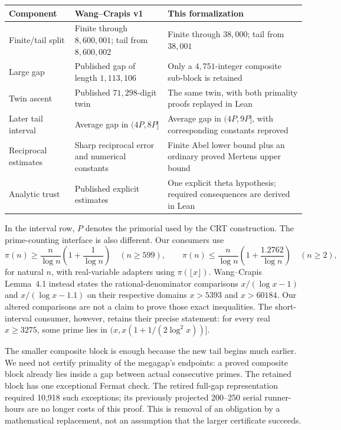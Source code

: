 \documentclass[11pt]{amsart}
\theoremstyle{definition}
\begin{document}
\begin{center}\small
\begin{tabular}{@{}L{.21\textwidth}L{.34\textwidth}L{.36\textwidth}@{}}
\toprule
Component & Wang--Crapis v1 & This formalization\\
\midrule
Finite/tail split & Finite through $8{,}600{,}001$; tail from
$8{,}600{,}002$ & Finite through $38{,}000$; tail from $38{,}001$\\[4pt]
Large gap & Published gap of length $1{,}113{,}106$ & Only a
$4{,}751$-integer composite sub-block is retained\\[4pt]
Twin ascent & Published $71{,}298$-digit twin & The same twin, with both
primality proofs replayed in Lean\\[4pt]
Later tail interval & Average gap in $(4P,8P]$ & Average gap in
$(4P,9P]$, with corresponding constants reproved\\[4pt]
Reciprocal estimates & Sharp reciprocal error and numerical constants
& Finite Abel lower bound plus an ordinary proved Mertens upper bound\\[4pt]
Analytic trust & Published explicit estimates & One explicit theta
hypothesis; required consequences are derived in Lean\\
\bottomrule
\end{tabular}
\end{center}

In the interval row, $P$ denotes the primorial used by the CRT construction.
The prime-counting interface is also different. Our consumers use
\[
 \pi(n)\geq\frac{n}{\log n}\left(1+\frac1{\log n}\right)
 \quad(n\geq599),\qquad
 \pi(n)\leq\frac{n}{\log n}\left(1+\frac{1.2762}{\log n}\right)
 \quad(n\geq2),
\]
for natural $n$, with real-variable adapters using $\pi(\lfloor x\rfloor)$.
Wang--Crapis Lemma~4.1 instead states the rational-denominator comparisons
$x/(\log x-1)$ and $x/(\log x-1.1)$ on their respective domains
$x>5393$ and $x>60184$. Our altered comparisons are not a claim to prove
those exact inequalities. The short-interval consumer, however, retains
their precise statement: for every real $x\geq3275$, some prime lies in
$(x,x(1+1/(2\log^2x))]$.

The smaller composite block is enough because the new tail begins much
earlier. We need not certify primality of the megagap's endpoints: a proved
composite block already lies inside a gap between actual consecutive
primes. The retained block has one exceptional Fermat check. The retired
full-gap representation required 10,918 such exceptions; its previously
projected 200--250 serial runner-hours are no longer costs of this proof.
This is removal of an obligation by a mathematical replacement, not an
assumption that the larger certificate succeeds.
\end{document}
